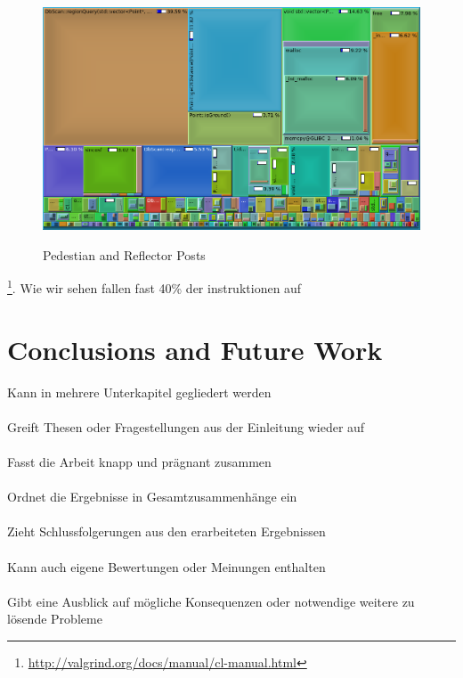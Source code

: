\documentclass[11pt,oneside,openright]{mpreport}
\begin{document}
\begin{figure}[!htb]
  \caption{Pedestian and Reflector Posts} 
  \centering
  \includegraphics[width=\textwidth]{bilder/call.png}
 \label{refPosts}
\end{figure}


\footnote{\url{http://valgrind.org/docs/manual/cl-manual.html}}.
Wie wir sehen fallen fast 40\% der instruktionen auf

\chapter{Conclusions and Future Work}
Kann in mehrere Unterkapitel gegliedert werden\\\\
Greift Thesen oder Fragestellungen aus der Einleitung wieder auf\\\\
Fasst die Arbeit knapp und prägnant zusammen\\\\
Ordnet die Ergebnisse in Gesamtzusammenhänge ein\\\\
Zieht Schlussfolgerungen aus den erarbeiteten Ergebnissen\\\\
Kann auch eigene Bewertungen oder Meinungen enthalten\\\\
Gibt eine Ausblick auf mögliche Konsequenzen oder notwendige weitere zu lösende Probleme

\printbibliography
\end{document}
